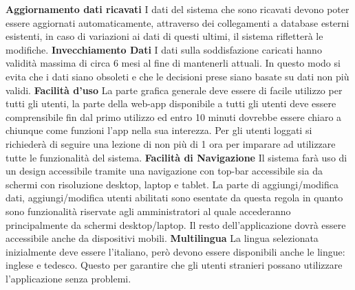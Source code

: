 \begin{rnfList}
        \rnfItem \textbf{Aggiornamento dati ricavati} I dati del sistema che sono ricavati devono poter essere aggiornati automaticamente, attraverso dei collegamenti a database esterni esistenti, in caso di variazioni ai dati di questi ultimi, il sistema rifletterà le modifiche.
        \rnfItem \textbf{Invecchiamento Dati} I dati sulla soddisfazione caricati hanno validità massima di circa 6 mesi al fine di mantenerli attuali. In questo modo si evita che i dati siano obsoleti e che le decisioni prese siano basate su dati non più validi.
        \rnfItem \textbf{Facilità d'uso} La parte grafica generale deve essere di facile utilizzo per tutti gli utenti, la parte della web-app disponibile a tutti gli utenti deve essere comprensibile fin dal primo utilizzo ed entro 10 minuti dovrebbe essere chiaro a chiunque come funzioni l'app nella sua interezza. Per gli utenti loggati si richiederà di seguire una lezione di non più di 1 ora per imparare ad utilizzare tutte le funzionalità del sistema.
        \rnfItem \textbf{Facilità di Navigazione} Il sistema farà uso di un design accessibile tramite una navigazione con top-bar accessibile sia da schermi con risoluzione desktop, laptop e tablet. La parte di aggiungi/modifica dati, aggiungi/modifica utenti abilitati sono esentate da questa regola in quanto sono funzionalità riservate agli amministratori al quale accederanno principalmente da schermi desktop/laptop. Il resto dell'applicazione dovrà essere accessibile anche da dispositivi mobili.
        \rnfItem \textbf{Multilingua} La lingua selezionata inizialmente deve essere l'italiano, però devono essere disponibili anche le lingue: inglese e tedesco. Questo per garantire che gli utenti stranieri possano utilizzare l'applicazione senza problemi.
    \end{rnfList}